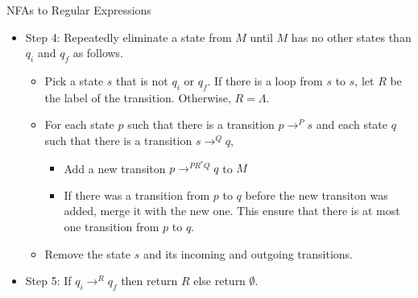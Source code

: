\documentclass{beamer}
\begin{document}
\begin{frame}[allowframebreaks]{NFAs to Regular Expressions}
\begin{itemize}
                After this step, there is at most one transition from $p$ to $q$ for all states $p$ and $q$. 
   \item Step 4: Repeatedly eliminate a state from $M$ until $M$ has no other states than $q_i$ and $q_f$ as follows.
   			\begin{itemize} 
   			  \item Pick a state $s$ that is not $q_i$ or $q_f$. 
   			  		If there is a loop from $s$ to $s$,
   			  		let $R$ be the label of the transition. Otherwise, $R=\Lambda$. 
   			  \item For each state $p$ such that there is a transition 
   			  		$p\longrightarrow^P s$ and each state $q$ such that there is a transition $s\longrightarrow^ Q q$,
   			  		\begin{itemize} 
   			  		  \item Add a new transiton $p\longrightarrow^{PR^*Q} q$ to $M$
   			  		  \item If there was a transition from $p$ to $q$ before the new transiton was added, 
   			  		  merge it with the new one. This ensure that there is at most one transition from $p$ to $q$. 
					\end{itemize}
   			   \item Remove the state $s$ and its incoming and outgoing transitions.
   			\end{itemize}    
   	\item Step 5: If $q_i\longrightarrow^R q_f$ then return $R$ else return $\emptyset$. 
\end{itemize}

\end{frame}
\end{document}
